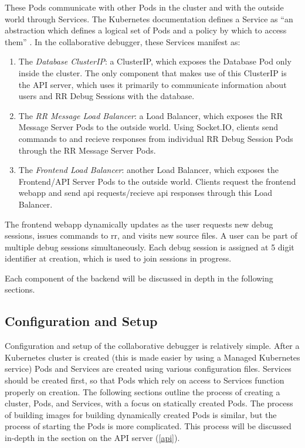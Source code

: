 \documentclass[12pt]{article}
\begin{document}
These Pods communicate with other Pods in the cluster and with the
outside world through Services.  The Kubernetes documentation defines
a Service as ``an abstraction which defines a logical set of Pods and
a policy by which to access them'' \cite{k8s_docs}.  In the
collaborative debugger, these Services manifest as:

\begin{enumerate}
\item The \textit{Database ClusterIP}: a ClusterIP, which exposes the
  Database Pod only inside the cluster.  The only component that makes
  use of this ClusterIP is the API server, which uses it primarily to
  communicate information about users and RR Debug Sessions with the
  database.
\item The \textit{RR Message Load Balancer}: a Load Balancer, which
  exposes the RR Message Server Pods to the outside world.  Using
  Socket.IO, clients send commands to and recieve responses from
  individual RR Debug Session Pods through the RR Message Server Pods.
\item The \textit{Frontend Load Balancer}: another Load Balancer,
  which exposes the Frontend/API Server Pods to the outside world.
  Clients request the frontend webapp and send api requests/recieve
  api responses through this Load Balancer.
\end{enumerate}

The frontend webapp dynamically updates as the user requests new debug
sessions, issues commands to rr, and visits new source files.  A user
can be part of multiple debug sessions simultaneously.  Each debug
session is assigned at 5 digit identifier at creation, which is used
to join sessions in progress.
\par

Each component of the backend will be discussed in depth in the
following sections.

\subsection{Configuration and Setup}

Configuration and setup of the collaborative debugger is relatively
simple.  After a Kubernetes cluster is created (this is made easier by
using a Managed Kubernetes service) Pods and Services are created
using various configuration files.  Services should be created first,
so that Pods which rely on access to Services function properly on
creation.  The following sections outline the process of creating a
cluster, Pods, and Services, with a focus on statically created Pods.
The process of building images for building dynamically created Pods
is similar, but the process of starting the Pods is more complicated.
This process will be discussed in-depth in the section on the API
server (\ref{api}).
\end{document}
